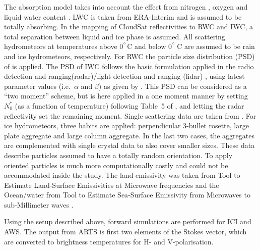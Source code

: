 \documentclass[amt, manuscript]{copernicus}
\begin{document}
The absorption model takes into account the effect from nitrogen
\citep{pwr:93}, oxygen \citep{pwr:93} and liquid water content \citep[LWC,][]{ellison2007permittivity}. LWC is taken from ERA-Interim  and is assumed to be totally absorbing. In the mapping of CloudSat reflectivities to RWC and IWC, a total separation between liquid and ice phase is assumed. All scattering hydrometeors at temperatures above 0$^{^{\circ}}$C and below 0$^{^{\circ}}$\,C are assumed to be rain and ice hydrometeors, respectively. For RWC the particle size
distribution (PSD) of \citet{abel2012improved} is applied. The PSD of IWC follows the basic formulation applied in the radio detection and ranging(radar)/light
detection and ranging (lidar) \citep[DARDAR,][\url{
	http://www.icare.univ-lille1.fr/projects/dardar}]{delanoe2008variational}, using latest parameter values (i.e.\ $\alpha$ and $\beta$) as given by \citet{cazenave2019evolution}.
This PSD can be considered as a ``two moment'' scheme, but is here applied in
a one moment manner by setting $N_0^*$ (as a function of temperature)
following Table~5 of \citet{delanoe2014normalized}, and letting the radar
reflectivity set the remaining moment. Single scattering data are taken from
\citet{eriksson:agene:18}. For ice hydrometeors, three habits are applied:
perpendicular 3-bullet rosette, large plate aggregate and large column
aggregate. In the last two cases, the aggregates are complemented with single
crystal data to also cover smaller sizes. These data describe particles
assumed to have a totally random orientation. To apply oriented particles is
much more computationally costly and could not be accommodated inside the
study. The land emissivity was taken from Tool to Estimate Land‐Surface Emissivities at Microwave frequencies \citep[TELSEM,][]{aires2011tool} and the
Ocean/water from Tool to Estimate Sea‐Surface Emissivity from Microwaves to sub‐Millimeter waves \citep[TESSEM,][]{prigent2017sea}.

Using the setup described above, forward simulations are performed for ICI and AWS. The output from ARTS is first two elements of the Stokes vector,  which are converted to brightness temperatures for H- and V-polarisation. 
\end{document}
